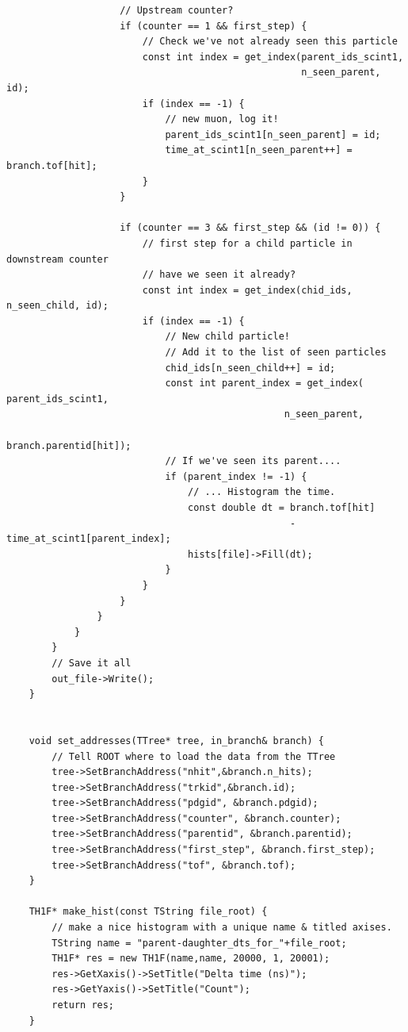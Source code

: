 \documentclass[]{article}
\begin{document}
\begin{verbatim}
                    // Upstream counter?
                    if (counter == 1 && first_step) {
                        // Check we've not already seen this particle
                        const int index = get_index(parent_ids_scint1,
                                                    n_seen_parent, id);
                        if (index == -1) {
                            // new muon, log it!
                            parent_ids_scint1[n_seen_parent] = id;
                            time_at_scint1[n_seen_parent++] = branch.tof[hit];
                        } 
                    }
                    
                    if (counter == 3 && first_step && (id != 0)) {
                        // first step for a child particle in downstream counter
                        // have we seen it already?
                        const int index = get_index(chid_ids, n_seen_child, id);
                        if (index == -1) {
                            // New child particle!
                            // Add it to the list of seen particles
                            chid_ids[n_seen_child++] = id; 
                            const int parent_index = get_index( parent_ids_scint1,
                                                 n_seen_parent,
                                                 branch.parentid[hit]);
                            // If we've seen its parent....
                            if (parent_index != -1) {
                                // ... Histogram the time.
                                const double dt = branch.tof[hit] 
                                                  - time_at_scint1[parent_index];
                                hists[file]->Fill(dt);
                            }
                        }
                    }
                }
            }
        }
        // Save it all
        out_file->Write();
    }
    

    void set_addresses(TTree* tree, in_branch& branch) {
        // Tell ROOT where to load the data from the TTree
        tree->SetBranchAddress("nhit",&branch.n_hits);
        tree->SetBranchAddress("trkid",&branch.id);
        tree->SetBranchAddress("pdgid", &branch.pdgid);
        tree->SetBranchAddress("counter", &branch.counter);
        tree->SetBranchAddress("parentid", &branch.parentid);
        tree->SetBranchAddress("first_step", &branch.first_step);
        tree->SetBranchAddress("tof", &branch.tof);
    }

    TH1F* make_hist(const TString file_root) {
        // make a nice histogram with a unique name & titled axises.
        TString name = "parent-daughter_dts_for_"+file_root;
        TH1F* res = new TH1F(name,name, 20000, 1, 20001);
        res->GetXaxis()->SetTitle("Delta time (ns)");
        res->GetYaxis()->SetTitle("Count");
        return res;
    }


\end{verbatim}
\end{document}
